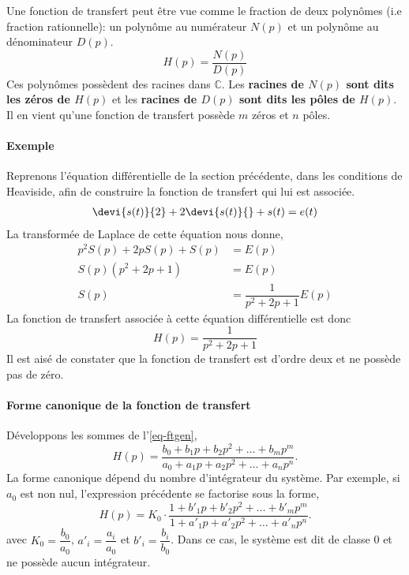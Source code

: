 Une fonction de transfert peut être vue comme le fraction de deux polynômes 
(i.e fraction rationnelle): un polynôme au numérateur $N(p)$ et un polynôme 
au dénominateur $D(p)$.
$$
H(p)=\dfrac{N(p)}{D(p)}
$$
Ces polynômes possèdent des racines dans $\mathbb{C}$. Les 
\textbf{racines de $N(p)$ sont dits les zéros de $H(p)$} et 
les \textbf{racines de $D(p)$ sont dits les pôles de $H(p)$}.
Il en vient qu'une fonction de transfert possède $m$ zéros et $n$ pôles.

\paragraph{Exemple}
Reprenons l'équation différentielle de la section précédente, dans 
les conditions de Heaviside, afin de construire la fonction de 
transfert qui lui est associée. 
\begin{align}
\devi{s(t)}{2}+2\devi{s(t)}{} + s(t) = e(t)
\end{align}
La transformée de Laplace de cette équation nous donne,
\begin{align*}
	p^2S(p)+2pS(p)+S(p)&=E(p)\\
	S(p)\left(p^2+2p+1\right)&=E(p)\\
	S(p)&=\dfrac{1}{p^2+2p+1}E(p)
\end{align*}
La fonction de transfert associée à cette équation différentielle est donc 
$$
H(p)=\dfrac{1}{p^2+2p+1}
$$
Il est aisé de constater que la fonction de transfert est d'ordre deux 
et ne possède pas de zéro.


\paragraph{Forme canonique de la fonction de transfert}
Développons les sommes de l'\cref{eq-ftgen},
$$
H(p)=\dfrac{b_0+b_1p+b_2p^2+\ldots+b_mp^m}{a_0+a_1p+a_2p^2+\ldots+a_np^n}.
$$
La forme canonique dépend du nombre d'intégrateur du système. 
Par exemple, si $a_0$ est non nul, l'expression précédente se factorise 
sous la forme,
$$
H(p)=K_0\cdot\dfrac{1+b'_1p+b'_2p^2+\ldots+b'_mp^m}
                   {1+a'_1p+a'_2p^2+\ldots+a'_np^n}.
$$
avec $K_0=\dfrac{b_0}{a_0}$, $a'_i=\dfrac{a_i}{a_0}$ et 
$b'_i=\dfrac{b_i}{b_0}$. Dans ce cas, le système est dit de 
classe 0 et ne possède aucun intégrateur.

